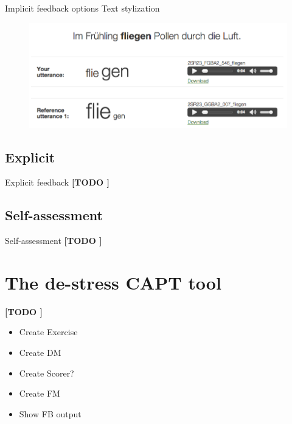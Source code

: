 \documentclass[xcolor={dvipsnames}]{beamer}
\newcommand{\TODO}[1]{{\color{red}\textbf{[TODO #1]}}}
\begin{document}
		\begin{frame}{Implicit feedback options}
		Text stylization
		\begin{figure}
		\includegraphics[width=\textwidth]{../img/screenshots/textStylization}
		\end{figure}
		\end{frame}
		
		
	\subsection{Explicit}
		\begin{frame}{Explicit feedback}
		\TODO{}
		\end{frame}
	\subsection{Self-assessment}
		\begin{frame}{Self-assessment}
		\TODO{}
		\end{frame}

	
\section{The de-stress CAPT tool }
		\begin{frame}{\TODO{}}
		\begin{itemize}
		\item Create Exercise
		\item Create DM
			\item Create Scorer?
		\item Create FM
		\item Show FB output
		\end{itemize}
		\end{frame}
\end{document}
